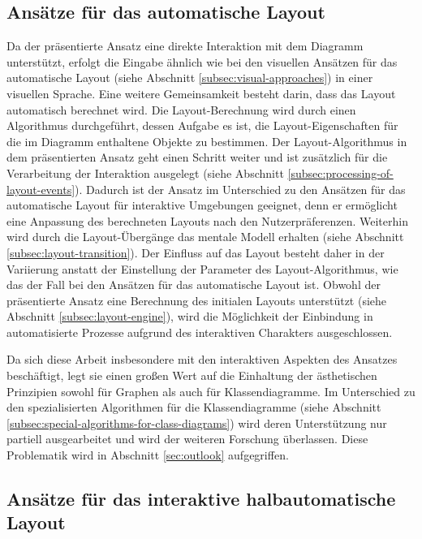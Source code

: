 \subsection{Ansätze für das automatische Layout}
\label{subsec:comparison-automatic-layout}

Da der präsentierte Ansatz eine direkte Interaktion mit dem Diagramm unterstützt, erfolgt die Eingabe ähnlich wie bei den visuellen Ansätzen für das automatische Layout (siehe Abschnitt \ref{subsec:visual-approaches}) in einer visuellen Sprache. Eine weitere Gemeinsamkeit besteht darin, dass das Layout automatisch berechnet wird. Die Layout-Berechnung wird durch einen Algorithmus durchgeführt, dessen Aufgabe es ist, die Layout-Eigenschaften für die im Diagramm enthaltene Objekte zu bestimmen. Der Layout-Algorithmus in dem präsentierten Ansatz geht einen Schritt weiter und ist zusätzlich für die Verarbeitung der Interaktion ausgelegt (siehe Abschnitt \ref{subsec:processing-of-layout-events}). Dadurch ist der Ansatz im Unterschied zu den Ansätzen für das automatische Layout für interaktive Umgebungen geeignet, denn er ermöglicht eine Anpassung des berechneten Layouts nach den Nutzerpräferenzen. Weiterhin wird durch die Layout-Übergänge das mentale Modell erhalten (siehe Abschnitt \ref{subsec:layout-transition}). Der Einfluss auf das Layout besteht daher in der Variierung anstatt der Einstellung der Parameter des Layout-Algorithmus, wie das der Fall bei den Ansätzen für das automatische Layout ist. Obwohl der präsentierte Ansatz eine Berechnung des initialen Layouts unterstützt (siehe Abschnitt \ref{subsec:layout-engine}), wird die Möglichkeit der Einbindung in automatisierte Prozesse aufgrund des interaktiven Charakters ausgeschlossen.

Da sich diese Arbeit insbesondere mit den interaktiven Aspekten des Ansatzes beschäftigt, legt sie einen großen Wert auf die Einhaltung der ästhetischen Prinzipien sowohl für Graphen als auch für Klassendiagramme. Im Unterschied zu den spezialisierten Algorithmen für die Klassendiagramme (siehe Abschnitt \ref{subsec:special-algorithms-for-class-diagrams}) wird deren Unterstützung nur partiell ausgearbeitet und wird der weiteren Forschung überlassen. Diese Problematik wird in Abschnitt \ref{sec:outlook} aufgegriffen.

\subsection{Ansätze für das interaktive halbautomatische Layout}
\label{subsec:comparison-interactive-layout}

